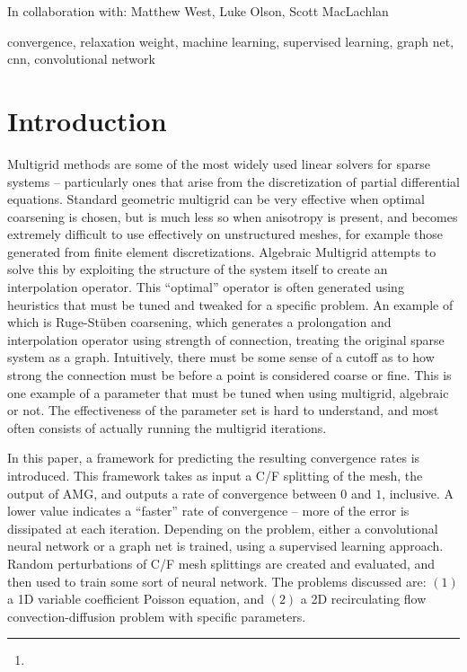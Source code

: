 \documentclass[review]{siamart190516}
\author{\TheName\thanks{\TheAddress}}
\title{{\TheTitle}}
\newcommand{\TheCollaborators}{%
  Matthew West,
  Luke Olson,
  Scott MacLachlan
}
\begin{document}
\maketitle

\begin{center}
In collaboration with:
  {\TheCollaborators}
\end{center}
\vspace{1cm}

\begin{abstract}
  
\end{abstract}

\begin{keywords}
  convergence, relaxation weight, machine learning, supervised learning, graph net, cnn, convolutional network
\end{keywords}

\section{Introduction}\label{sec:intro}

Multigrid methods are some of the most widely used linear solvers for sparse systems -- particularly ones that arise from the discretization of partial differential equations.  Standard geometric multigrid can be very effective when optimal coarsening is chosen, but is much less so when anisotropy is present, and becomes extremely difficult to use effectively on unstructured meshes, for example those generated from finite element discretizations.  Algebraic Multigrid attempts to solve this by exploiting the structure of the system itself to create an interpolation operator.  This ``optimal'' operator is often generated using heuristics that must be tuned and tweaked for a specific problem.  An example of which is Ruge-St\"{u}ben coarsening, which generates a prolongation and interpolation operator using strength of connection, treating the original sparse system as a graph.  Intuitively, there must be some sense of a cutoff as to how strong the connection must be before a point is considered coarse or fine.  This is one example of a parameter that must be tuned when using multigrid, algebraic or not.  The effectiveness of the parameter set is hard to understand, and most often consists of actually running the multigrid iterations.

In this paper, a framework for predicting the resulting convergence rates is introduced.  This framework takes as input a C/F splitting of the mesh, the output of AMG, and outputs a rate of convergence between $0$ and $1$, inclusive.  A lower value indicates a ``faster'' rate of convergence -- more of the error is dissipated at each iteration.  Depending on the problem, either a convolutional neural network or a graph net is trained, using a supervised learning approach.  Random perturbations of C/F mesh splittings are created and evaluated, and then used to train some sort of neural network.  The problems discussed are: $(1)$ a 1D variable coefficient Poisson equation, and $(2)$ a 2D recirculating flow convection-diffusion problem with specific parameters.
\end{document}
